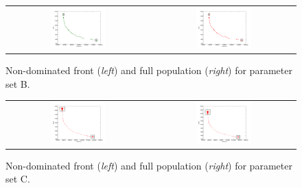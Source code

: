 \documentclass[paper=a4, fontsize=10pt]{scrartcl}
\begin{document}
\begin{figure}[H]
\centering
\begin{tabular}{cc}
\includegraphics[width=0.4\textwidth]{figures/population-500-generations-200-group-0-05-crossover-1-0-mutation-0-005-run-4-front} &
\includegraphics[width=0.4\textwidth]{figures/population-500-generations-200-group-0-05-crossover-1-0-mutation-0-005-run-4-population} \\
\end{tabular}
\caption{Non-dominated front (\textit{left}) and full population (\textit{right}) for parameter set B.}
\end{figure}

\begin{figure}[H]
\centering
\begin{tabular}{cc}
\includegraphics[width=0.4\textwidth]{figures/population-1000-generations-200-group-0-2-crossover-1-0-mutation-0-05-run-2-front} &
\includegraphics[width=0.4\textwidth]{figures/population-1000-generations-200-group-0-2-crossover-1-0-mutation-0-05-run-2-population} \\
\end{tabular}
\caption{Non-dominated front (\textit{left}) and full population (\textit{right}) for parameter set C.}
\end{figure}
\end{document}
